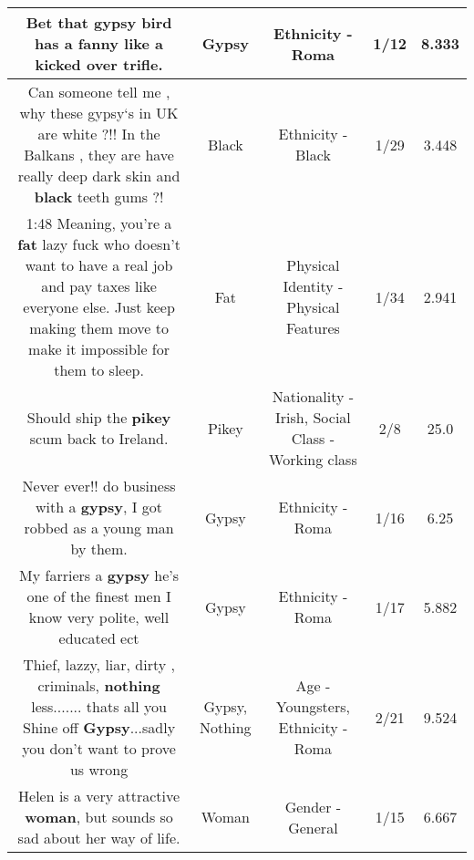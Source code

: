 \documentclass[11pt]{article}
\newlength\mylength
\begin{document}
\begin{center}
\begin{longtable}{|C{.65\mylength}|C{.30\mylength}|C{.12\mylength}|C{.12\mylength}|C{.12\mylength}|}
  \small Bet that \textbf{gypsy} bird has a fanny like a kicked over trifle.\normalsize   & Gypsy & Ethnicity - Roma & 1/12 & 8.333 \\  \hline
  \small Can someone tell me , why these gypsy‘s in UK are white ?!! In the Balkans , they are have really deep dark skin and \textbf{black} teeth gums ?!\normalsize   & Black & Ethnicity - Black & 1/29 & 3.448 \\  \hline
  \small 1:48 Meaning, you're a \textbf{fat} lazy fuck who doesn't want to have a real job and pay taxes like everyone else. Just keep making them move to make it impossible for them to sleep.\normalsize   & Fat & Physical Identity - Physical Features & 1/34 & 2.941 \\  \hline
  \small Should ship the \textbf{p\textbf{ikey}} scum back to Ireland.\normalsize   & Pikey & Nationality - Irish, Social Class - Working class & 2/8 & 25.0 \\  \hline
  \small Never ever!! do business with a \textbf{gypsy}, I got robbed as a young man by them.\normalsize   & Gypsy & Ethnicity - Roma & 1/16 & 6.25 \\  \hline
  \small My farriers a \textbf{gypsy} he's one of the finest men I know very polite, well educated ect\normalsize   & Gypsy & Ethnicity - Roma & 1/17 & 5.882 \\  \hline
  \small Thief, lazzy, liar, dirty , criminals, \textbf{nothing} less....... thats all you Shine off \textbf{Gypsy}...sadly you don't want to prove us wrong\normalsize   & Gypsy, Nothing & Age - Youngsters, Ethnicity - Roma & 2/21 & 9.524 \\  \hline
  \small Helen is a very attractive \textbf{woman}, but sounds so sad about her way of life.\normalsize   & Woman & Gender - General & 1/15 & 6.667 \\  \hline

\end{longtable}
\end{center}
\end{document}
